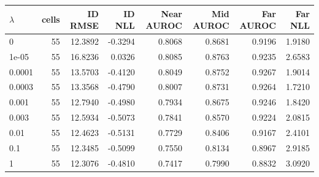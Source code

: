 \begin{tabular}{lrrrrrrr}
\toprule
$\lambda$ & cells & ID RMSE & ID NLL & Near AUROC & Mid AUROC & Far AUROC & Far NLL \\
\midrule
0 & 55 & 12.3892 & -0.3294 & 0.8068 & 0.8681 & 0.9196 & 1.9180 \\
1e-05 & 55 & 16.8236 & 0.0326 & 0.8085 & 0.8763 & 0.9235 & 2.6583 \\
0.0001 & 55 & 13.5703 & -0.4120 & 0.8049 & 0.8752 & 0.9267 & 1.9014 \\
0.0003 & 55 & 13.3568 & -0.4790 & 0.8007 & 0.8731 & 0.9264 & 1.7210 \\
0.001 & 55 & 12.7940 & -0.4980 & 0.7934 & 0.8675 & 0.9246 & 1.8420 \\
0.003 & 55 & 12.5934 & -0.5073 & 0.7841 & 0.8570 & 0.9224 & 2.0815 \\
0.01 & 55 & 12.4623 & -0.5131 & 0.7729 & 0.8406 & 0.9167 & 2.4101 \\
0.1 & 55 & 12.3485 & -0.5099 & 0.7550 & 0.8134 & 0.8967 & 2.9185 \\
1 & 55 & 12.3076 & -0.4810 & 0.7417 & 0.7990 & 0.8832 & 3.0920 \\
\bottomrule
\end{tabular}
